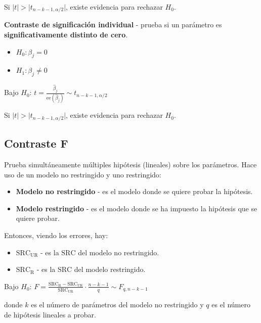 \documentclass[10pt, a4paper, landscape]{extarticle}
\newcommand{\se}{\mathrm{ee}}
\newcommand{\SSR}{\mathrm{SRC}}
\begin{document}
\begin{multicols}{3}
Si $\lvert t \rvert > \lvert t_{n - k - 1, \alpha/2} \rvert$, existe evidencia para rechazar $H_0$.

\textbf{Contraste de significación individual} - prueba si un parámetro es \textbf{significativamente distinto de cero}.

\begin{itemize}[leftmargin=*]
	\item $H_0: \beta_j = 0$
	\item $H_1: \beta_j \neq 0$
\end{itemize}

\begin{center}
	Bajo $H_0$: \quad $t = \frac{\hat{\beta}_j}{\se(\hat{\beta}_j)} \sim t_{n - k - 1, \alpha/2}$
\end{center}

Si $\lvert t \rvert > \lvert t_{n - k - 1, \alpha/2} \rvert$, existe evidencia para rechazar $H_0$.

\subsection*{Contraste F}

Prueba simultáneamente múltiples hipótesis (lineales) sobre los parámetros. Hace uso de un modelo no restringido y uno restringido:

\begin{itemize}[leftmargin=*]
	\item \textbf{Modelo no restringido} - es el modelo donde se quiere probar la hipótesis.
	\item \textbf{Modelo restringido} - es el modelo donde se ha impuesto la hipótesis que se quiere probar.
\end{itemize}

Entonces, viendo los errores, hay:

\begin{itemize}[leftmargin=*]
	\item \textbf{$\SSR_\mathrm{UR}$} - es la $\SSR$ del modelo no restringido.
	\item \textbf{$\SSR_\mathrm{R}$} - es la $\SSR$ del modelo restringido.
\end{itemize}

\begin{center}
	Bajo $H_0$: \quad $F = \frac{\SSR_\mathrm{R} - \SSR_\mathrm{UR}}{\SSR_\mathrm{UR}} \cdot \frac{n - k - 1}{q} \sim F_{q, n - k - 1}$
\end{center}

donde $k$ es el número de parámetros del modelo no restringido y $q$ es el número de hipótesis lineales a probar.


\end{multicols}
\end{document}
